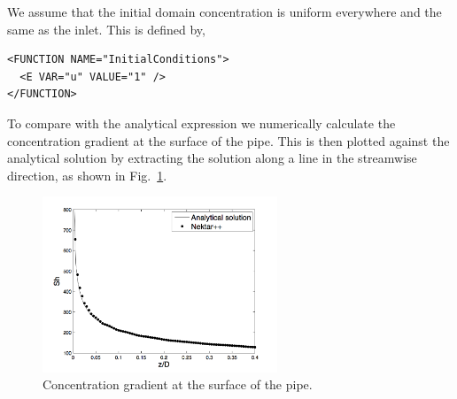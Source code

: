 We assume that the initial domain concentration is uniform everywhere and the
same as the inlet. This is defined by, 
\begin{lstlisting}[style=XMLStyle]
<FUNCTION NAME="InitialConditions">
  <E VAR="u" VALUE="1" />
</FUNCTION>
\end{lstlisting}

To compare with the analytical expression we numerically calculate the
concentration gradient at the surface of the pipe. This is then plotted against
the analytical solution by extracting the solution along a line in the
streamwise direction, as shown in Fig.~\ref{f:adrsolver:masstransport}.

\begin{figure}[h!]
\begin{center}
\includegraphics[width=7cm]{img/graetz-nusselt}
\caption{Concentration gradient at the surface of the pipe.}
\label{f:adrsolver:masstransport}
\end{center}
\end{figure}



